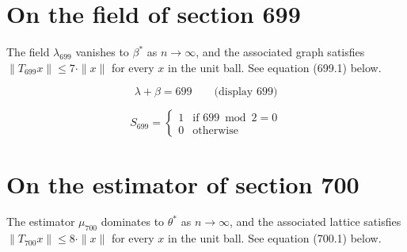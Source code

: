 \documentclass{article}
\begin{document}
\section{On the field of section 699}
The field $\lambda_{699}$ vanishes to $\beta^{*}$ as $n \to \infty$,
and the associated graph satisfies $\|T_{699} x\| \leq 7 \cdot \|x\|$
for every $x$ in the unit ball. See equation (699.1) below.

$$
\lambda + \beta = 699 \qquad \text{(display 699)}
$$

\begin{equation}
S_{699} = \begin{cases} 1 & \text{if } 699 \bmod 2 = 0 \\ 0 & \text{otherwise} \end{cases}
\end{equation}

\section{On the estimator of section 700}
The estimator $\mu_{700}$ dominates to $\theta^{*}$ as $n \to \infty$,
and the associated lattice satisfies $\|T_{700} x\| \leq 8 \cdot \|x\|$
for every $x$ in the unit ball. See equation (700.1) below.
\end{document}
